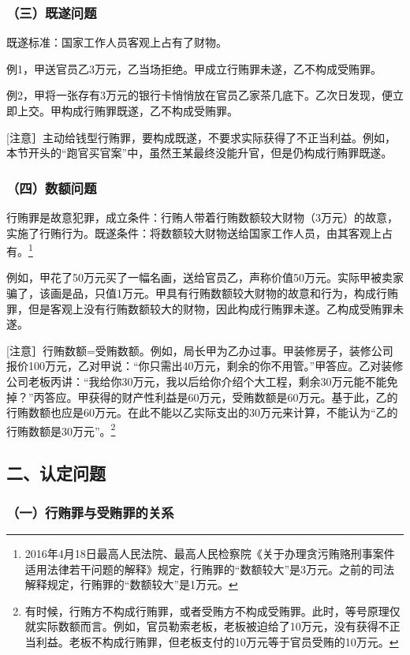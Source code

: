 \subsubsection*{（三）既遂问题}

既遂标准：国家工作人员客观上占有了财物。

例1，甲送官员乙3万元，乙当场拒绝。甲成立行贿罪未遂，乙不构成受贿罪。

例2，甲将一张存有3万元的银行卡悄悄放在官员乙家茶几底下。乙次日发现，便立即上交。甲构成行贿罪既遂，乙不构成受贿罪。

[注意］主动给钱型行贿罪，要构成既遂，不要求实际获得了不正当利益。例如，本节开头的“跑官买官案”中，虽然王某最终没能升官，但是仍构成行贿罪既遂。

\subsubsection*{（四）数额问题}

行贿罪是故意犯罪，成立条件：行贿人带着行贿数额较大财物（3万元）的故意，实施了行贿行为。既遂条件：将数额较大财物送给国家工作人员，由其客观上占有。\footnote{2016年4月18日最高人民法院、最高人民检察院《关于办理贪污贿赂刑事案件适用法律若干问题的解释》规定，行贿罪的“数额较大”是3万元。之前的司法解释规定，行贿罪的“数额较大”是1万元。}

例如，甲花了50万元买了一幅名画，送给官员乙，声称价值50万元。实际甲被卖家骗了，该画是品，只值1万元。甲具有行贿数额较大财物的故意和行为，构成行贿罪，但是客观上没有行贿数额较大的财物，因此构成行贿罪未遂。乙构成受贿罪未遂。

[注意］行贿数额=受贿数额。例如，局长甲为乙办过事。甲装修房子，装修公司报价100万元，乙对甲说：“你只需出40万元，剩余的你不用管。”甲答应。乙对装修公司老板丙讲：“我给你30万元，我以后给你介绍个大工程，剩余30万元能不能免掉？”丙答应。甲获得的财产性利益是60万元，受贿数额是60万元。基于此，乙的行贿数额也应是60万元。在此不能以乙实际支出的30万元来计算，不能认为“乙的行贿数额是30万元”。\footnote{有时候，行贿方不构成行贿罪，或者受贿方不构成受贿罪。此时，等号原理仅就实际数额而言。例如，官员勒索老板，老板被迫给了10万元，没有获得不正当利益。老板不构成行贿罪，但老板支付的10万元等于官员受贿的10万元。}

\subsection*{二、认定问题}

\subsubsection*{（一）行贿罪与受贿罪的关系}

